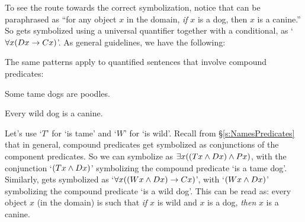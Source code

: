 To see the route towards the correct symbolization, notice that  can be paraphrased as ``for any object $x$ in the domain, \emph{if} $x$ is a dog, then $x$ is a canine.''   So  gets symbolized using a universal quantifier together with a conditional, as `$\forall x(Dx \rightarrow Cx)$'.  As general guidelines, we have the following:




The same patterns apply to quantified sentences that involve compound predicates:
	\begin{earg}
		\item[\ex{quan3}] Some tame dogs are poodles.
		\item[\ex{quan4}] Every wild dog is a canine.
	\end{earg}
Let's use `$T$' for `\blank is tame' and `$W$' for `\blank is wild'.  Recall from \S\ref{s:NamesPredicates} that in general, compound predicates get symbolized as conjunctions of the component predicates.  So we can symbolize  as $\exists x((Tx \wedge Dx) \wedge Px)$, with the conjunction `$(Tx \wedge Dx)$' symbolizing the compound predicate `is a tame dog'.  Similarly,  gets symbolized as `$\forall x((Wx \wedge Dx) \rightarrow Cx)$', with `$(Wx \wedge Dx)$' symbolizing the compound predicate `is a wild dog'.  This can be read as: every object $x$ (in the domain) is such that \emph{if} $x$ is wild and $x$ is a dog, \emph{then} $x$ is a canine.

